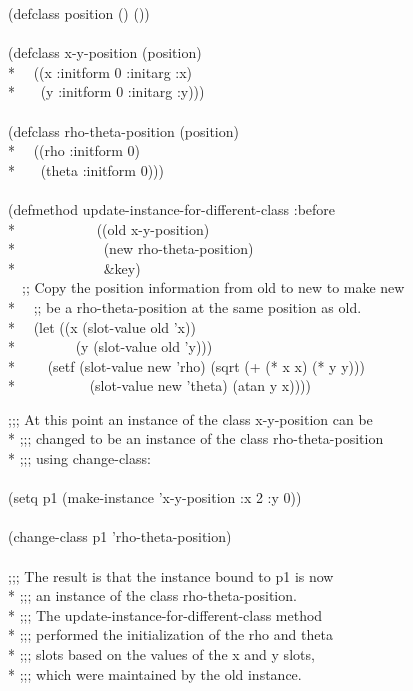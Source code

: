 \begin{defun}
\begin{lisp}
(defclass position () ()) \\
\\
(defclass x-y-position (position) \\*
~~((x :initform 0 :initarg :x) \\*
~~~(y :initform 0 :initarg :y))) \\
\\
(defclass rho-theta-position (position) \\*
~~((rho :initform 0) \\*
~~~(theta :initform 0))) \\
\\
(defmethod update-instance-for-different-class :before \\*
~~~~~~~~~~~((old x-y-position)  \\*
~~~~~~~~~~~~(new rho-theta-position) \\*
~~~~~~~~~~~~\&key) \\
~~;; Copy the position information from old to new to make new \\*
~~;; be a rho-theta-position at the same position as old. \\*
~~(let ((x (slot-value old 'x)) \\*
~~~~~~~~(y (slot-value old 'y))) \\*
~~~~(setf (slot-value new 'rho) (sqrt (+ (* x x) (* y y))) \\*
~~~~~~~~~~(slot-value new 'theta) (atan y x))))
\end{lisp}
\begin{lisp}
;;; At this point an instance of the class x-y-position can be \\*
;;; changed to be an instance of the class rho-theta-position \\*
;;; using change-class: \\
\\
(setq p1 (make-instance 'x-y-position :x 2 :y 0)) \\
\\
(change-class p1 'rho-theta-position) \\
\\
;;; The result is that the instance bound to p1 is now \\*
;;; an instance of the class rho-theta-position. \\*
;;; The update-instance-for-different-class method \\*
;;; performed the initialization of the rho and theta \\*
;;; slots based on the values of the x and y slots, \\*
;;; which were maintained by the old instance.
\end{lisp}



\end{defun}
